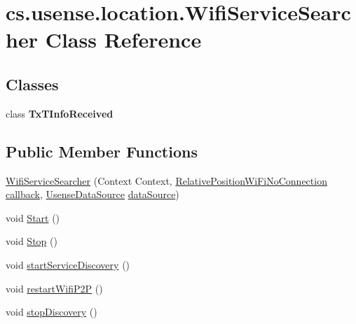 \hypertarget{classcs_1_1usense_1_1location_1_1_wifi_service_searcher}{}\section{cs.\+usense.\+location.\+Wifi\+Service\+Searcher Class Reference}
\label{classcs_1_1usense_1_1location_1_1_wifi_service_searcher}
\subsection*{Classes}
\begin{DoxyCompactItemize}
\item 
class {\bfseries Tx\+T\+Info\+Received}
\end{DoxyCompactItemize}
\subsection*{Public Member Functions}
\begin{DoxyCompactItemize}
\item 
\hyperlink{classcs_1_1usense_1_1location_1_1_wifi_service_searcher_aadef7d33a18ab389882c68a6bccfd24c}{Wifi\+Service\+Searcher} (Context Context, \hyperlink{classcs_1_1usense_1_1location_1_1_relative_position_wi_fi_no_connection}{Relative\+Position\+Wi\+Fi\+No\+Connection} \hyperlink{classcs_1_1usense_1_1location_1_1_wifi_service_searcher_ad71e138681812ba5928f041b84c2e39c}{callback}, \hyperlink{classcs_1_1usense_1_1db_1_1_usense_data_source}{Usense\+Data\+Source} \hyperlink{classcs_1_1usense_1_1location_1_1_wifi_service_searcher_aeee40bdaa21143fae75f3c02f4fef986}{data\+Source})
\item 
void \hyperlink{classcs_1_1usense_1_1location_1_1_wifi_service_searcher_adf367eec13b3d865f280d4d68cd56996}{Start} ()
\item 
void \hyperlink{classcs_1_1usense_1_1location_1_1_wifi_service_searcher_a99156d48a7a8801f72030da72470ad5e}{Stop} ()
\item 
void \hyperlink{classcs_1_1usense_1_1location_1_1_wifi_service_searcher_ae27d4b0c7e10b9557e9408520b42a784}{start\+Service\+Discovery} ()
\item 
void \hyperlink{classcs_1_1usense_1_1location_1_1_wifi_service_searcher_a78c74de26e3b6e90940d60a511f70822}{restart\+Wifi\+P2\+P} ()
\item 
void \hyperlink{classcs_1_1usense_1_1location_1_1_wifi_service_searcher_a588de68bec82e44ae9da3db878a3548c}{stop\+Discovery} ()
\end{DoxyCompactItemize}
